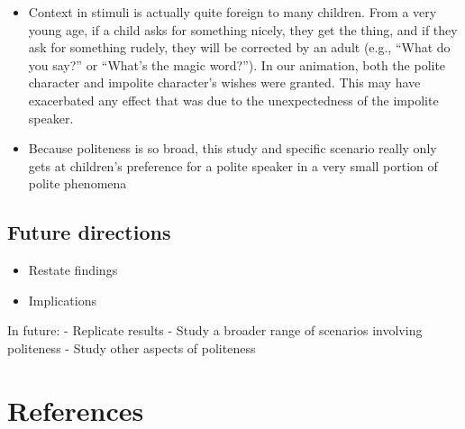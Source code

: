 \documentclass[
  english,
  man,floatsintext]{apa6}
\providecommand{\tightlist}{%
  \setlength{\itemsep}{0pt}\setlength{\parskip}{0pt}}
\begin{document}
\begin{itemize}
\item
  Context in stimuli is actually quite foreign to many children. From a very young age, if a child asks for something nicely, they get the thing, and if they ask for something rudely, they will be corrected by an adult (e.g., ``What do you say?'' or ``What's the magic word?''). In our animation, both the polite character and impolite character's wishes were granted. This may have exacerbated any effect that was due to the unexpectedness of the impolite speaker.
\item
  Because politeness is so broad, this study and specific scenario really only gets at children's preference for a polite speaker in a very small portion of polite phenomena
\end{itemize}

\hypertarget{future-directions}{%
\subsection{Future directions}\label{future-directions}}

\begin{itemize}
\tightlist
\item
  Restate findings
\item
  Implications
\end{itemize}

In future:
- Replicate results
- Study a broader range of scenarios involving politeness
- Study other aspects of politeness

\hypertarget{references}{%
\section{References}\label{references}}

\begingroup
\setlength{\parindent}{-0.5in}
\setlength{\leftskip}{0.5in}
\end{document}

